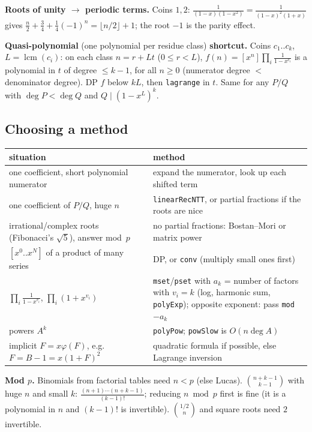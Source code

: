 	\textbf{Roots of unity $\to$ periodic terms.} Coins $1,2$: $\frac1{(1-x)(1-x^2)}=\frac1{(1-x)^2(1+x)}$ gives $\frac n2+\frac34+\frac14(-1)^n=\lfloor n/2\rfloor+1$; the root $-1$ is the parity effect.

	\textbf{Quasi-polynomial} (one polynomial per residue class) \textbf{shortcut.} Coins $c_1..c_k$, $L=\operatorname{lcm}(c_i)$: on each class $n=r+Lt$ ($0\le r<L$), $f(n)=[x^n]\prod_i\frac1{1-x^{c_i}}$ is a polynomial in $t$ of degree $\le k-1$, for all $n\ge0$ (numerator degree $<$ denominator degree). DP $f$ below $kL$, then \texttt{lagrange} in $t$. Same for any $P/Q$ with $\deg P<\deg Q$ and $Q\mid(1-x^L)^k$.

	\subsection{Choosing a method}
	\begin{center}\small\renewcommand{\arraystretch}{1.3}
	\begin{tabular}{@{}L{3.6cm}@{\ \ }L{5.05cm}@{}}
	situation & method \\ \hline
	one coefficient, short polynomial numerator & expand the numerator, look up each shifted term \\
	one coefficient of $P/Q$, huge $n$ & \texttt{linearRecNTT}, or partial fractions if the roots are nice \\
	irrational/complex roots (Fibonacci's $\sqrt5$), answer mod~$p$ & no partial fractions: Bostan--Mori or matrix power \\
	$[x^0..x^N]$ of a product of many series & DP, or \texttt{conv} (multiply small ones first) \\
	$\prod_i\frac1{1-x^{v_i}}$, $\prod_i(1+x^{v_i})$ & \texttt{mset}/\texttt{pset} with $a_k$ = number of factors with $v_i=k$ (log, harmonic sum, \texttt{polyExp}); opposite exponent: pass \texttt{mod}$-a_k$ \\
	powers $A^k$ & \texttt{polyPow}; \texttt{powSlow} is $O(n\deg A)$ \\
	implicit $F=x\varphi(F)$, e.g.\ $F=B-1=x(1+F)^2$ & quadratic formula if possible, else Lagrange inversion \\
	\end{tabular}
	\end{center}
	\textbf{Mod $p$.} Binomials from factorial tables need $n<p$ (else Lucas). $\binom{n+k-1}{k-1}$ with huge $n$ and small $k$: $\frac{(n+1)\cdots(n+k-1)}{(k-1)!}$; reducing $n\bmod p$ first is fine (it is a polynomial in $n$ and $(k-1)!$ is invertible). $\binom{1/2}n$ and square roots need $2$ invertible.

